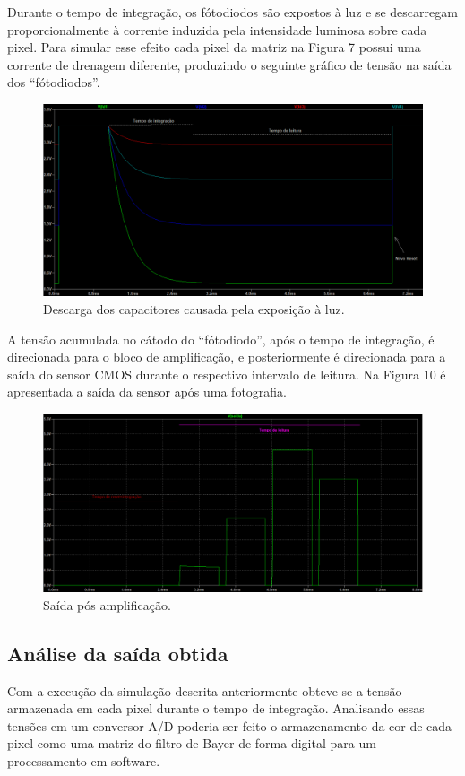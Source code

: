 \documentclass[10pt,a4paper,twocolumn]{article}
\begin{document}
	Durante o tempo de integração, os fótodiodos são expostos à luz e se descarregam proporcionalmente à corrente induzida pela intensidade luminosa sobre cada pixel. Para simular esse efeito cada pixel da matriz na Figura 7 possui uma corrente de drenagem diferente, produzindo o seguinte gráfico de tensão na saída dos ``fótodiodos''.
	
	\begin{figure}[!h]
		\centering
		\includegraphics[scale=0.28]{imagens/descarga.png}
		\caption{Descarga dos capacitores causada pela exposição à luz.}
	\end{figure}

	A tensão acumulada no cátodo do ``fótodiodo'', após o tempo de integração, é direcionada para o bloco de amplificação, e posteriormente é direcionada para a saída do sensor CMOS durante o respectivo intervalo de leitura. Na Figura 10 é apresentada a saída da sensor após uma fotografia.
	
	\begin{figure}[!h]
		\centering
		\includegraphics[scale=0.256]{imagens/saida.png}
		\caption{Saída pós amplificação.}
	\end{figure}
		
	\subsection*{Análise da saída obtida}
	 Com a execução da simulação descrita anteriormente obteve-se a tensão armazenada em cada pixel durante o tempo de integração. Analisando essas tensões em um conversor A/D poderia ser feito o armazenamento da cor de cada pixel como uma matriz do filtro de Bayer \cite{bayer} de forma digital para um processamento em software.
	 
\end{document}
